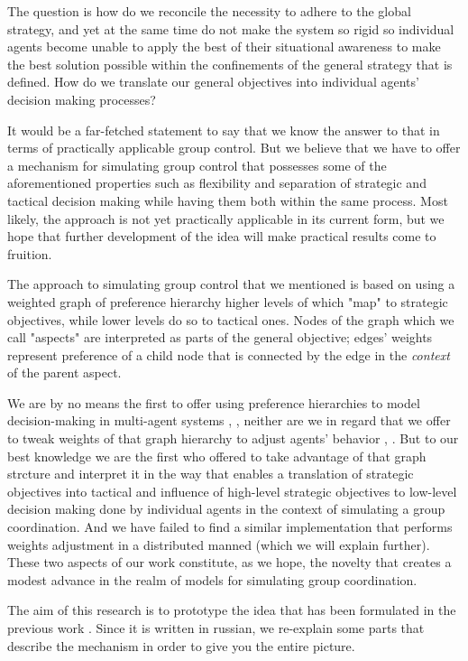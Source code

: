 The question is how do we reconcile the necessity to adhere to the global strategy, and yet at the same time do not make
the system so rigid so individual agents become unable to apply the best of their situational awareness to make the best
solution possible within the confinements of the general strategy that is defined. How do we translate our general
objectives into individual agents' decision making processes?

It would be a far-fetched statement to say that we know the answer to that in terms of practically applicable group
control. But we believe that we have to offer a mechanism for simulating group control that possesses some of the
aforementioned properties such as flexibility and separation of strategic and tactical decision making while having them
both within the same process. Most likely, the approach is not yet practically applicable in its current form, but we
hope that further development of the idea will make practical results come to fruition.

The approach to simulating group control that we mentioned is based on using a weighted graph of preference hierarchy
higher levels of which "map" to strategic objectives, while lower levels do so to tactical ones. Nodes of the graph
which we call "aspects" are interpreted as parts of the general objective; edges' weights represent preference of a
child node that is connected by the edge in the \textit{context} of the parent aspect.

We are by no means the first to offer using preference hierarchies to model decision-making in multi-agent systems
\cite{cartvehishvili-2018-model}, \cite{drakaki-2018-intelligent}, neither are we in regard that we offer to tweak
weights of that graph hierarchy to adjust agents' behavior \cite{zytniewski-2016-application},
\cite{brintrup-2010-behaviour}. But to our best knowledge we are the first who offered to take advantage of that graph
strcture and interpret it in the way that enables a translation of strategic objectives into tactical and influence of
high-level strategic objectives to low-level decision making done by individual agents in the context of simulating a
group coordination. And we have failed to find a similar implementation that performs weights adjustment in a
distributed manned (which we will explain further). These two aspects of our work constitute, as we hope, the novelty
that creates a modest advance in the realm of models for simulating group coordination.

The aim of this research is to prototype the idea that has been formulated in the previous work
\cite{murashov-2021-ahp}. Since it is written in russian, we re-explain some parts that describe the mechanism in
order to give you the entire picture.

